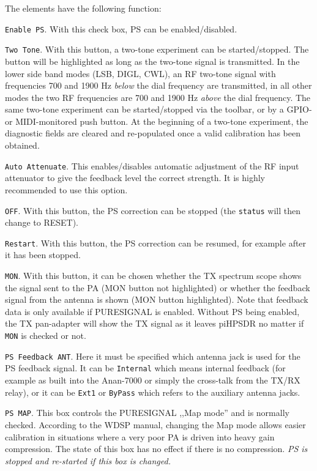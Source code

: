 \documentclass[12pt]{book}
\def\rett#1{\texttt{\color{red}#1}}
\def\pH{pi\-HPSDR }
\begin{document}
The elements have the following function:

\rett{Enable PS}. With this check box, PS can be enabled/disabled.

\rett{Two Tone}. With this button, a two-tone experiment can be started/stopped. The button
will be highlighted as long as the two-tone signal is transmitted. In the lower side band
modes (LSB, DIGL, CWL), an RF two-tone signal with frequencies 700 and 1900 Hz
\textit{below} the dial frequency are transmitted, in all other modes the two
RF frequencies are 700 and 1900 Hz \textit{above} the dial frequency. The same two-tone
experiment can be started/stopped via the toolbar, or by a GPIO- or MIDI-monitored
push button. At the beginning of a two-tone experiment, the diagnostic fields
are cleared and re-populated once a valid calibration has been obtained.

\rett{Auto Attenuate}. This enables/disables automatic adjustment of the RF input
attenuator to give the feedback level the correct strength. It is highly recommended
to use this option.

\rett{OFF}. With this button, the PS correction can be stopped (the \rett{status} will
then change to RESET).

\rett{Restart}. With this button, the PS correction can be resumed, for example after
it has been stopped.

\rett{MON}. With this button, it can be chosen whether the TX spectrum scope shows
the signal sent to the PA (MON button not highlighted) or whether the feedback signal
from the antenna is shown (MON button highlighted). Note that feedback data is only
available if PURESIGNAL is enabled. Without PS being enabled, the TX pan-adapter will
show the TX signal as it leaves \pH no matter if \rett{MON} is checked or not.

\rett{PS Feedback ANT}. Here it must be specified which antenna jack is used for the
PS feedback signal. It can be \rett{Internal} which means internal feedback
(for example as built into the Anan-7000 or  simply the cross-talk from the
TX/RX relay), or it can be \rett{Ext1} or \rett{ByPass} which refers to the
auxiliary antenna jacks.

\rett{PS MAP}. This box controls the PURESIGNAL ,,Map mode'' and is normally checked.
According to the WDSP manual, changing the Map mode allows easier calibration in
situations where a very poor PA is driven into heavy gain compression. The state
of this box has
no effect if there is no compression. \textit{PS is stopped and re-started if
this box is changed.}
\end{document}
